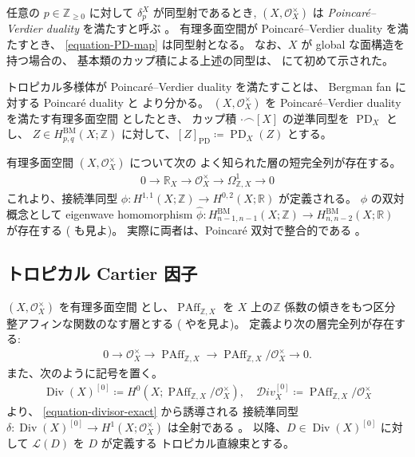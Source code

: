 \documentclass[a4paper,dvipdfmx,reqno,12pt]{amsart}
\theoremstyle{definition}
\newcommand{\deq}{\coloneqq}
\newcommand{\opn}[1]{\operatorname{#1}}
\newcommand{\PD}[1]{[#1]_{\mathrm{PD}}}
\numberwithin{equation}{section}
\begin{document}
任意の $p\in \mathbb{Z}_{\geq 0}$ に対して
$\delta_{p}^{X}$ が同型射であるとき,
$(X,\mathcal{O}_X^{\times})$ は
\emph{Poincar\'e--Verdier duality}
を満たすと呼ぶ \cite[Definition 6.4]{MR4637248}。
有理多面空間が Poincar\'e--Verdier duality を満たすとき、
\cref{equation-PD-map} は同型射となる。
なお、$X$ が global な面構造を持つ場合の、
基本類のカップ積による上述の同型は、
\cite[Theorem 5.3]{MR3894860} にて初めて示された。


トロピカル多様体が
Poincar\'e--Verdier duality を満たすことは、
Bergman fan に対する Poincar\'e duality
\cite[Proposition 5.5]{MR3894860} と
\cite[Theorem 6.7]{MR4637248}
より分かる。
$(X,\mathcal{O}_X^{\times})$ を
Poincar\'e--Verdier duality を満たす有理多面空間
としたとき、
カップ積
$\cdot \frown [X]$
の逆準同型を $\opn{PD}_X$ とし、
$Z\in H^{\mathrm{BM}}_{p,q}(X;\mathbb{Z})$
に対して、$\PD{Z}\deq \opn{PD}_X(Z)$ とする。



有理多面空間 $(X,\mathcal{O}_X^{\times})$ について次の
よく知られた層の短完全列が存在する。
\begin{align}
0\to \mathbb{R}_X \to 
\mathcal{O}_X^{\times} \to \Omega_{\mathbb{Z},X}^{1}\to 0
\end{align}
これより、接続準同型
$\phi \colon H^{1,1}(X;\mathbb{Z})
\to H^{0,2}(X;\mathbb{R})$ が定義される。
$\phi$ の双対概念として
eigenwave homomorphism
$\hat{\phi} \colon
H_{n-1,n-1}^{\mathrm{BM}}(X;\mathbb{Z})
\to H_{n,n-2}^{\mathrm{BM}}(X;\mathbb{R})$
が存在する \cite[(5.2)]{MR3330789}
(\cite[Definition 2.9]{MR3894860} も見よ)。
実際に両者は、Poincar\'e 双対で整合的である
\cite[Lemma 5.13]{MR3894860}。

\subsection{トロピカル Cartier 因子}

$(X,\mathcal{O}_X^{\times})$ を有理多面空間
とし、$\opn{PAff}_{\mathbb{Z},X}$ を
$X$ 上の$\mathbb{Z}$ 係数の傾きをもつ区分
整アフィンな関数のなす層とする
(\cite[Definition 4.1]{MR3894860}
や\cite[Definition 3.8 and Remark
3.9]{MR4246795}を見よ)。
定義より次の層完全列が存在する:
\begin{align}
\label{equation-divisor-exact}
0 \to  \mathcal{O}_X^{\times} 
\to \opn{PAff}_{\mathbb{Z},X} \to 
\opn{PAff}_{\mathbb{Z},X}/\mathcal{O}_X^{\times}
\to 0.
\end{align}
また、次のように記号を置く。
\begin{align}
\opn{Div}(X)^{[0]}\deq H^{0}(X;
\opn{PAff}_{\mathbb{Z},X}/\mathcal{O}_X^{\times}), 
\quad \mathcal{D}iv_X^{[0]}\deq \opn{PAff}_{\mathbb{Z},X}/\mathcal{O}_X^{\times}
\end{align}
\cite[Lemma 4.5]{MR3894860} より、
\eqref{equation-divisor-exact} から誘導される
接続準同型
$\delta \colon \opn{Div}(X)^{[0]}\to 
H^{1}(X;\mathcal{O}_X^{\times})$ は全射である
\cite[Proposition 4.6]{MR3894860}。
以降、$D\in \opn{Div}(X)^{[0]}$ に対して
$\mathcal{L}(D)$ を $D$ が定義する
トロピカル直線束とする。
\end{document}
